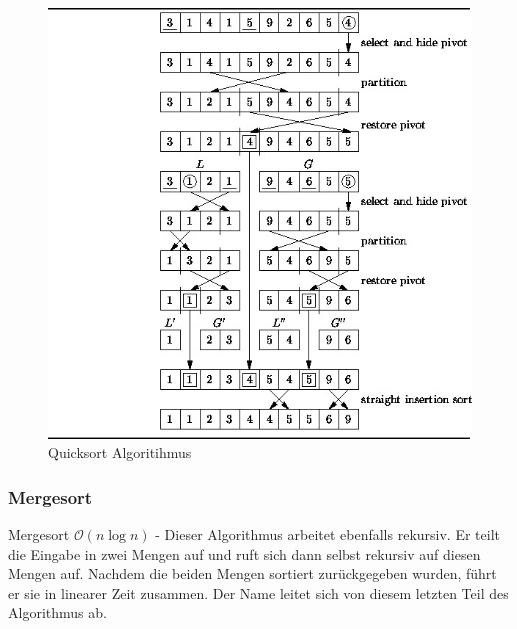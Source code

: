 \documentclass[a4paper]{article}
\begin{document}
\begin{figure}[h]
    \centering
    \includegraphics[scale = 0.4]{Pictures/Qcksort.jpeg}
    \caption{Quicksort Algoritihmus}
    \label{fig:QuickSort}
\end{figure}

        
\newpage
    \subsubsection{Mergesort}\label{Mergesort}
        Mergesort $\mathcal{O}(n \log n)$ - Dieser Algorithmus arbeitet ebenfalls rekursiv. Er teilt die Eingabe in zwei Mengen auf und ruft sich dann selbst rekursiv auf diesen Mengen auf. Nachdem die beiden Mengen sortiert zurückgegeben wurden, führt er sie in linearer Zeit zusammen. Der Name leitet sich von diesem letzten Teil des Algorithmus ab.
        
\end{document}
